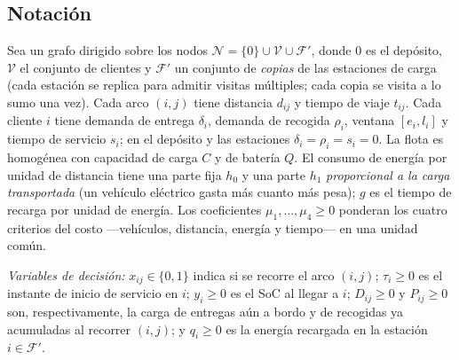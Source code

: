 \documentclass[conference]{IEEEtran}
\begin{document}
\subsection{Notaci\'on}
Sea un grafo dirigido sobre los nodos $\mathcal{N}=\{0\}\cup\mathcal{V}\cup
\mathcal{F}'$, donde $0$ es el dep\'osito, $\mathcal{V}$ el conjunto de clientes
y $\mathcal{F}'$ un conjunto de \emph{copias} de las estaciones de carga (cada
estaci\'on se replica para admitir visitas m\'ultiples; cada copia se visita a lo
sumo una vez). Cada arco $(i,j)$ tiene distancia $d_{ij}$ y tiempo de viaje
$t_{ij}$. Cada cliente $i$ tiene demanda de entrega $\delta_i$, demanda de
recogida $\rho_i$, ventana $[e_i,l_i]$ y tiempo de servicio $s_i$; en el
dep\'osito y las estaciones $\delta_i=\rho_i=s_i=0$. La flota es homog\'enea con
capacidad de carga $C$ y de bater\'ia $Q$. El consumo de energ\'ia por unidad de
distancia tiene una parte fija $h_0$ y una parte $h_1$ \emph{proporcional a la
carga transportada} (un veh\'iculo el\'ectrico gasta m\'as cuanto m\'as pesa);
$g$ es el tiempo de recarga por unidad de energ\'ia. Los coeficientes
$\mu_1,\dots,\mu_4\ge0$ ponderan los cuatro criterios del costo ---veh\'iculos,
distancia, energ\'ia y tiempo--- en una unidad com\'un.

\emph{Variables de decisi\'on:} $x_{ij}\in\{0,1\}$ indica si se recorre el arco
$(i,j)$; $\tau_i\ge0$ es el instante de inicio de servicio en $i$; $y_i\ge0$ es
el SoC al llegar a $i$; $D_{ij}\ge0$ y $P_{ij}\ge0$ son, respectivamente, la
carga de entregas a\'un a bordo y de recogidas ya acumuladas al recorrer
$(i,j)$; y $q_i\ge0$ es la energ\'ia recargada en la estaci\'on $i\in\mathcal{F}'$.
\end{document}
